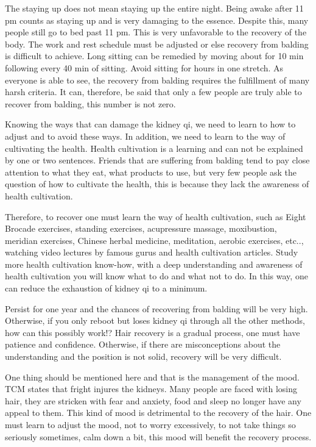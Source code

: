 \documentclass[
]{book}
\begin{document}
The staying up does not mean staying up the entire night. Being awake after 11 pm counts as staying up and is very damaging to the essence. Despite this, many people still go to bed past 11 pm. This is very unfavorable to the recovery of the body. The work and rest schedule must be adjusted or else recovery from balding is difficult to achieve. Long sitting can be remedied by moving about for 10 min following every 40 min of sitting. Avoid sitting for hours in one stretch. As everyone is able to see, the recovery from balding requires the fulfillment of many harsh criteria. It can, therefore, be said that only a few people are truly able to recover from balding, this number is not zero.

Knowing the ways that can damage the kidney qi, we need to learn to how to adjust and to avoid these ways. In addition, we need to learn to the way of cultivating the health. Health cultivation is a learning and can not be explained by one or two sentences. Friends that are suffering from balding tend to pay close attention to what they eat, what products to use, but very few people ask the question of how to cultivate the health, this is because they lack the awareness of health cultivation.

Therefore, to recover one must learn the way of health cultivation, such as Eight Brocade exercises, standing exercises, acupressure massage, moxibustion, meridian exercises, Chinese herbal medicine, meditation, aerobic exercises, etc.., watching video lectures by famous gurus and health cultivation articles. Study more health cultivation know-how, with a deep understanding and awareness of health cultivation you will know what to do and what not to do. In this way, one can reduce the exhaustion of kidney qi to a minimum.

Persist for one year and the chances of recovering from balding will be very high. Otherwise, if you only reboot but loses kidney qi through all the other methods, how can this possibly work!? Hair recovery is a gradual process, one must have patience and confidence. Otherwise, if there are misconceptions about the understanding and the position is not solid, recovery will be very difficult.

One thing should be mentioned here and that is the management of the mood. TCM states that fright injures the kidneys. Many people are faced with losing hair, they are stricken with fear and anxiety, food and sleep no longer have any appeal to them. This kind of mood is detrimental to the recovery of the hair. One must learn to adjust the mood, not to worry excessively, to not take things so seriously sometimes, calm down a bit, this mood will benefit the recovery process.
\end{document}
